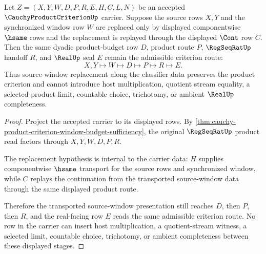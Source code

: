 \begin{theorem}
\label{thm:cauchy-product-criterion-stability-under-equivalent-source-windows}
Let $Z=(X,Y,W,D,P,R,E,H,C,L,N)$ be an accepted $\CauchyProductCriterionUp$ carrier. Suppose the source rows $X,Y$ and the synchronized window row $W$ are replaced only by displayed componentwise $\hsame$ rows and the replacement is replayed through the displayed $\Cont$ row $C$. Then the same dyadic product-budget row $D$, product route $P$, $\RegSeqRatUp$ handoff $R$, and $\RealUp$ seal $E$ remain the admissible criterion route:
$$
X,Y\longmapsto W\longmapsto D\longmapsto P\longmapsto R\longmapsto E .
$$
Thus source-window replacement along the classifier data preserves the product criterion and cannot introduce host multiplication, quotient stream equality, a selected product limit, countable choice, trichotomy, or ambient $\RealUp$ completeness.
\end{theorem}
\begin{proof}
Project the accepted carrier to its displayed rows. By \autoref{thm:cauchy-product-criterion-window-budget-sufficiency}, the original $\RegSeqRatUp$ product read factors through $X,Y,W,D,P,R$.

The replacement hypothesis is internal to the carrier data: $H$ supplies componentwise $\hsame$ transport for the source rows and synchronized window, while $C$ replays the continuation from the transported source-window data through the same displayed product route.

Therefore the transported source-window presentation still reaches $D$, then $P$, then $R$, and the real-facing row $E$ reads the same admissible criterion route. No row in the carrier can insert host multiplication, a quotient-stream witness, a selected limit, countable choice, trichotomy, or ambient completeness between these displayed stages.
\end{proof}

